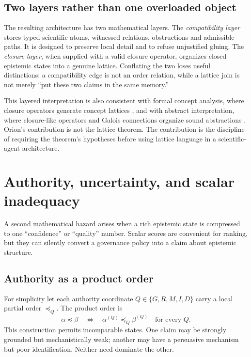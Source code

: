 \subsection{Two layers rather than one overloaded object}

The resulting architecture has two mathematical layers. The \emph{compatibility layer} stores typed scientific atoms, witnessed relations, obstructions and admissible paths. It is designed to preserve local detail and to refuse unjustified gluing. The \emph{closure layer}, when supplied with a valid closure operator, organizes closed epistemic states into a genuine lattice. Conflating the two loses useful distinctions: a compatibility edge is not an order relation, while a lattice join is not merely ``put these two claims in the same memory.''

This layered interpretation is also consistent with formal concept analysis, where closure operators generate concept lattices \cite{ganter1999}, and with abstract interpretation, where closure-like operators and Galois connections organize sound abstractions \cite{cousot1977}. Orion's contribution is not the lattice theorem. The contribution is the discipline of requiring the theorem's hypotheses before using lattice language in a scientific-agent architecture.

\section{Authority, uncertainty, and scalar inadequacy}\label{sec:authority}

A second mathematical hazard arises when a rich epistemic state is compressed to one ``confidence'' or ``quality'' number. Scalar scores are convenient for ranking, but they can silently convert a governance policy into a claim about epistemic structure.

\subsection{Authority as a product order}

For simplicity let each authority coordinate \(Q\in\{G,R,M,I,D\}\) carry a local partial order \(\preceq_Q\). The product order is
\[
\alpha\preceq\beta
\quad\Longleftrightarrow\quad
\alpha^{(Q)}\preceq_Q\beta^{(Q)}\quad\text{for every }Q.
\]
This construction permits incomparable states. One claim may be strongly grounded but mechanistically weak; another may have a persuasive mechanism but poor identification. Neither need dominate the other.

